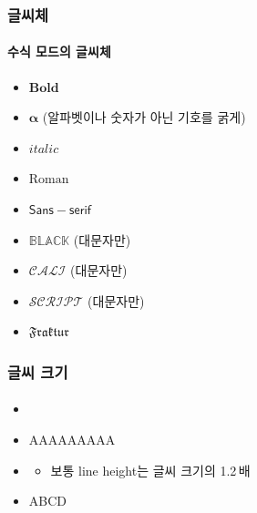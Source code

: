  \begin{frame}[fragile]
    \frametitle{글씨체}
    \framesubtitle{수식 모드의 글씨체}
    \begin{itemize}
      \item \texttt{} $\mathbf{Bold}$
      \item \texttt{\boldsymbol{\alpha}} $\boldsymbol{\alpha}$ (알파벳이나 숫자가 아닌 기호를 굵게)
      \item \texttt{} $\mathit{italic}$
      \item \texttt{} $\mathrm{Roman}$
      \item \texttt{} $\mathsf{Sans-serif}$
      \item \texttt{} $\mathbb{BLACK}$ (대문자만)
      \item \texttt{} $\mathcal{CALI}$ (대문자만)
      \item \texttt{} $\mathscr{SCRIPT}$ (대문자만)
      \item \texttt{} $\mathfrak{Fraktur}$
    \end{itemize}
  \end{frame}
  
  \begin{frame}[fragile]
    \frametitle{글씨 크기}
    \framesubtitle{}
    \begin{itemize}
      \item \texttt{\tiny \scriptsize \footnotesize \small \normalsize} \texttt{\large \Large \LARGE \huge \Huge}
      \item {\tiny A\scriptsize A\footnotesize A\small A\normalsize A\large A\Large A\LARGE A\huge A\Huge}
      \item \texttt{\fontsize{글씨 크기}{line height}\selectfont}
      \begin{itemize}
        \item 보통 line height는 글씨 크기의 1.2\,배
      \end{itemize}
      \item {\fontsize{60}{72}\selectfont A\fontsize{30}{36}\selectfont B\fontsize{50}{72}\selectfont C\fontsize{80}{86}\selectfont D}
    \end{itemize}
  \end{frame}
  
